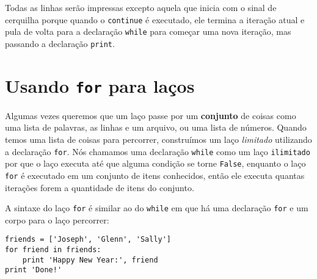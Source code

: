 %
Todas as linhas serão impressas excepto aquela que inicia com o sinal de
cerquilha porque quando o {\tt continue} é executado, ele termina a iteração
atual e pula de volta para a declaração {\tt while} para começar uma nova
iteração, mas passando a declaração {\tt print}.

\section{Usando {\tt for} para laços}


Algumas vezes queremos que um laço passe por um {\bf conjunto} de coisas
como uma lista de palavras, as linhas e um arquivo, ou uma lista de números.
Quando temos uma lista de coisas para percorrer, construímos um laço
\emph{limitado} utilizando a declaração {\tt for}. Nós chamamos uma declaração
{\tt while} como um laço {\tt ilimitado} por que o laço executa até que alguma
condição se torne {\tt False}, enquanto o laço {\tt for} é executado em um
conjunto de itens conhecidos, então ele executa quantas iterações forem a
quantidade de itens do conjunto.


A sintaxe do laço {\tt for} é similar ao do {\tt while} em que há uma
declaração {\tt for} e um corpo para o laço percorrer:

\beforeverb
\begin{verbatim}
friends = ['Joseph', 'Glenn', 'Sally']
for friend in friends:
    print 'Happy New Year:', friend
print 'Done!'
\end{verbatim}
\afterverb
%

